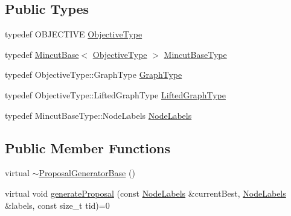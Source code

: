 \subsection*{Public Types}
\begin{DoxyCompactItemize}
\item 
typedef O\+B\+J\+E\+C\+T\+I\+V\+E \hyperlink{classnifty_1_1graph_1_1optimization_1_1mincut_1_1ProposalGeneratorBase_a24d5eabaefc534df63239cbd61b114b0}{Objective\+Type}
\item 
typedef \hyperlink{classnifty_1_1graph_1_1optimization_1_1mincut_1_1MincutBase}{Mincut\+Base}$<$ \hyperlink{classnifty_1_1graph_1_1optimization_1_1mincut_1_1ProposalGeneratorBase_a24d5eabaefc534df63239cbd61b114b0}{Objective\+Type} $>$ \hyperlink{classnifty_1_1graph_1_1optimization_1_1mincut_1_1ProposalGeneratorBase_aa0e35cfcd2a6f657cc49c319f9f471a0}{Mincut\+Base\+Type}
\item 
typedef Objective\+Type\+::\+Graph\+Type \hyperlink{classnifty_1_1graph_1_1optimization_1_1mincut_1_1ProposalGeneratorBase_aefaaf5c95701fdd45406071373b5ccb9}{Graph\+Type}
\item 
typedef Objective\+Type\+::\+Lifted\+Graph\+Type \hyperlink{classnifty_1_1graph_1_1optimization_1_1mincut_1_1ProposalGeneratorBase_a6aa5998f3aded22cb7a6ba8e02e9c163}{Lifted\+Graph\+Type}
\item 
typedef Mincut\+Base\+Type\+::\+Node\+Labels \hyperlink{classnifty_1_1graph_1_1optimization_1_1mincut_1_1ProposalGeneratorBase_a7d708f82cab20149a88eefada79a23b0}{Node\+Labels}
\end{DoxyCompactItemize}
\subsection*{Public Member Functions}
\begin{DoxyCompactItemize}
\item 
virtual \hyperlink{classnifty_1_1graph_1_1optimization_1_1mincut_1_1ProposalGeneratorBase_adb4871ecc71dc899304c4dada946a7e6}{$\sim$\+Proposal\+Generator\+Base} ()
\item 
virtual void \hyperlink{classnifty_1_1graph_1_1optimization_1_1mincut_1_1ProposalGeneratorBase_a43c7c022995d7b9955aa5e97cb8aefcd}{generate\+Proposal} (const \hyperlink{classnifty_1_1graph_1_1optimization_1_1mincut_1_1ProposalGeneratorBase_a7d708f82cab20149a88eefada79a23b0}{Node\+Labels} \&current\+Best, \hyperlink{classnifty_1_1graph_1_1optimization_1_1mincut_1_1ProposalGeneratorBase_a7d708f82cab20149a88eefada79a23b0}{Node\+Labels} \&labels, const size\+\_\+t tid)=0
\end{DoxyCompactItemize}


